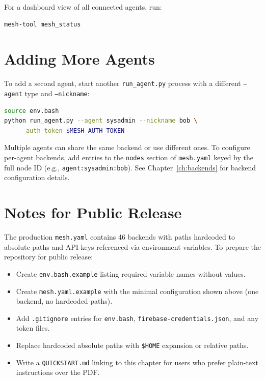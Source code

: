 \documentclass[11pt,letterpaper]{report}
\newcommand{\code}[1]{\texttt{#1}}
\begin{document}
For a dashboard view of all connected agents, run:

\begin{lstlisting}[language=bash]
mesh-tool mesh_status
\end{lstlisting}

\section{Adding More Agents}

To add a second agent, start another \code{run\_agent.py} process
with a different \code{--agent} type and \code{--nickname}:

\begin{lstlisting}[language=bash]
source env.bash
python run_agent.py --agent sysadmin --nickname bob \
    --auth-token $MESH_AUTH_TOKEN
\end{lstlisting}

Multiple agents can share the same backend or use different ones.
To configure per-agent backends, add entries to the \code{nodes}
section of \code{mesh.yaml} keyed by the full node ID
(e.g., \code{agent:sysadmin:bob}). See
Chapter~\ref{ch:backends} for backend configuration details.

\section{Notes for Public Release}

The production \code{mesh.yaml} contains 46 backends with paths
hardcoded to absolute paths and API keys referenced via
environment variables. To prepare the repository for public release:

\begin{itemize}[nosep]
  \item Create \code{env.bash.example} listing required variable names
        without values.
  \item Create \code{mesh.yaml.example} with the minimal configuration
        shown above (one backend, no hardcoded paths).
  \item Add \code{.gitignore} entries for \code{env.bash},
        \code{firebase-credentials.json}, and any token files.
  \item Replace hardcoded absolute paths with \code{\$HOME} expansion
        or relative paths.
  \item Write a \code{QUICKSTART.md} linking to this chapter for
        users who prefer plain-text instructions over the PDF.
\end{itemize}
\end{document}
